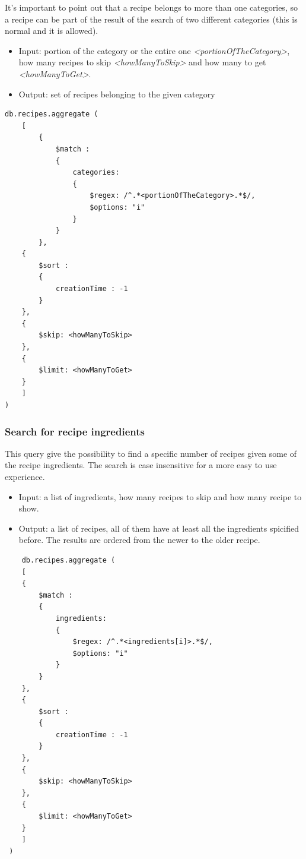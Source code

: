 \documentclass[a4paper]{report}
\begin{document}
\noindent It's important to point out that a recipe belongs to more than one categories, so a recipe can be part of the result of the search of two different categories (this is normal and it is allowed). 

\begin{itemize}
	\item Input: portion of the category or the entire one \emph{<portionOfTheCategory>}, how many recipes to skip \emph{<howManyToSkip>} and how many to get \emph{<howManyToGet>}.
	\item Output: set of recipes belonging to the given category
\end{itemize}
\begin{lstlisting}
db.recipes.aggregate (
	[
		{ 
			$match : 
			{ 
				categories: 
				{
					$regex: /^.*<portionOfTheCategory>.*$/,
					$options: "i"
				} 
			}  
		},
	{ 
		$sort : 
		{ 
			creationTime : -1 
		} 
	},
	{ 
		$skip: <howManyToSkip> 
	},
	{ 
		$limit: <howManyToGet> 
	}	
	]
)
\end{lstlisting}

\subsubsection{Search for recipe ingredients}
This query give the possibility to find a specific number of recipes given some of the recipe ingredients. The search is case insensitive for a more easy to use experience.
\begin{itemize}
	\item Input: a list of ingredients, how many recipes to skip and how many recipe to show.
	\item Output: a list of recipes, all of them have at least all the ingredients spicified before. The results are ordered from the newer to the older recipe.
\end{itemize}

\lstset{ language=java}
\begin{lstlisting}
	db.recipes.aggregate (
	[
	{ 
		$match : 
		{ 
			ingredients: 
			{
				$regex: /^.*<ingredients[i]>.*$/,
				$options: "i"
			} 
		}  
	},
	{ 
		$sort : 
		{ 
			creationTime : -1 
		} 
	},
	{ 
		$skip: <howManyToSkip> 
	},
	{ 
		$limit: <howManyToGet> 
	}	
	]
 )
\end{lstlisting} 
\end{document}
